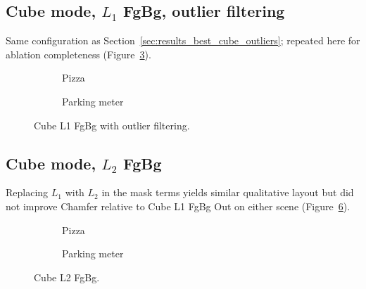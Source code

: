 \documentclass{report}
\begin{document}
\subsection{Cube mode, $L_1$ FgBg, outlier filtering}
\label{subsec:ablation_cube_l1_fgbg_outliers}

Same configuration as Section~\ref{sec:results_best_cube_outliers}; repeated here for ablation completeness (Figure~\ref{fig:ablation_cube_l1_fgbg_out}).

\begin{figure}[H]
    \centering
    \begin{subfigure}{\textwidth}
        \centering
        \caption{Pizza}
        \label{fig:ablation_cube_l1_fgbg_out_pizza}
    \end{subfigure}
    \vspace{0.6em}
    \begin{subfigure}{\textwidth}
        \centering
        \caption{Parking meter}
        \label{fig:ablation_cube_l1_fgbg_out_parking}
    \end{subfigure}
    \caption{Cube L1 FgBg with outlier filtering.}
    \label{fig:ablation_cube_l1_fgbg_out}
\end{figure}

\subsection{Cube mode, $L_2$ FgBg}
\label{subsec:ablation_cube_l2_fgbg}

Replacing $L_1$ with $L_2$ in the mask terms yields similar qualitative layout but did not improve Chamfer relative to Cube L1 FgBg Out on either scene (Figure~\ref{fig:ablation_cube_l2}).

\begin{figure}[H]
    \centering
    \begin{subfigure}{\textwidth}
        \centering
        \caption{Pizza}
        \label{fig:ablation_cube_l2_pizza}
    \end{subfigure}
    \vspace{0.6em}
    \begin{subfigure}{\textwidth}
        \centering
        \caption{Parking meter}
        \label{fig:ablation_cube_l2_parking}
    \end{subfigure}
    \caption{Cube L2 FgBg.}
    \label{fig:ablation_cube_l2}
\end{figure}
\end{document}
